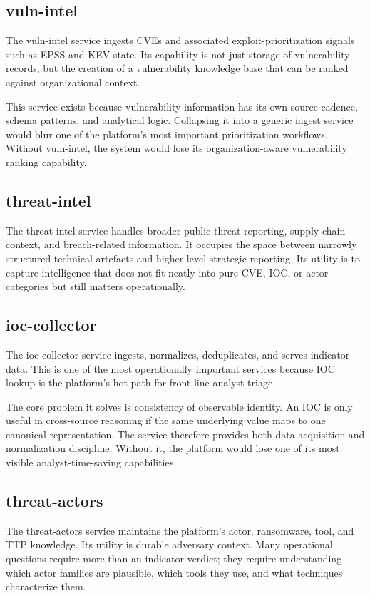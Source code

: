 \subsection{vuln-intel}
The vuln-intel service ingests CVEs and associated exploit-prioritization signals such as EPSS and KEV state. Its capability is not just storage of vulnerability records, but the creation of a vulnerability knowledge base that can be ranked against organizational context.

This service exists because vulnerability information has its own source cadence, schema patterns, and analytical logic. Collapsing it into a generic ingest service would blur one of the platform's most important prioritization workflows. Without vuln-intel, the system would lose its organization-aware vulnerability ranking capability.

\subsection{threat-intel}
The threat-intel service handles broader public threat reporting, supply-chain context, and breach-related information. It occupies the space between narrowly structured technical artefacts and higher-level strategic reporting. Its utility is to capture intelligence that does not fit neatly into pure CVE, IOC, or actor categories but still matters operationally.

\subsection{ioc-collector}
The ioc-collector service ingests, normalizes, deduplicates, and serves indicator data. This is one of the most operationally important services because IOC lookup is the platform's hot path for front-line analyst triage.

The core problem it solves is consistency of observable identity. An IOC is only useful in cross-source reasoning if the same underlying value maps to one canonical representation. The service therefore provides both data acquisition and normalization discipline. Without it, the platform would lose one of its most visible analyst-time-saving capabilities.

\subsection{threat-actors}
The threat-actors service maintains the platform's actor, ransomware, tool, and TTP knowledge. Its utility is durable adversary context. Many operational questions require more than an indicator verdict; they require understanding which actor families are plausible, which tools they use, and what techniques characterize them.

